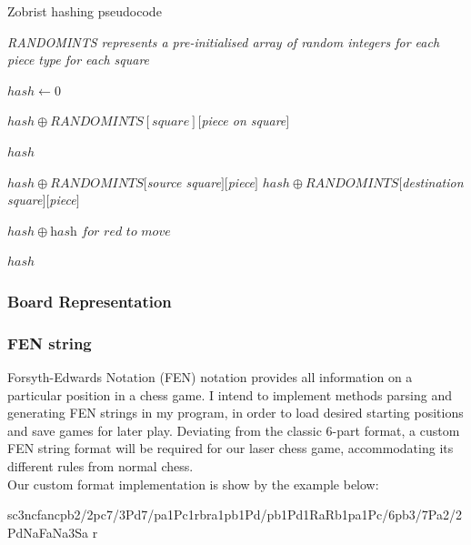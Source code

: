 \documentclass[../main/main.tex]{subfiles}
\begin{document}
\begin{algorithm}[H]
\caption{Zobrist hashing pseudocode}
\begin{algorithmic}
    \item \textit{RANDOMINTS represents a pre-initialised array of random integers for each piece type for each square}
    
    \bigskip

        \State $hash \gets 0$

                \State $hash \oplus RANDOMINTS[square][$\textit{piece on square}$]$
            \EndIf
        \EndFor
        
        \State \Return $hash$
    \EndFunction

    \bigskip

        \State $hash \oplus RANDOMINTS[$\textit{source square}$][$\textit{piece}$]$
        \State $hash \oplus RANDOMINTS[$\textit{destination square}$][$\textit{piece}$]$

            \State $hash \oplus \textit{hash for red to move}$ 
        \EndIf
        
        \State \Return $hash$
    \EndFunction
\end{algorithmic}
\end{algorithm}

\subsubsection{Board Representation}
\subsubsection*{FEN string}
Forsyth-Edwards Notation (FEN) notation provides all information on a particular position in a chess game. I intend to implement methods parsing and generating FEN strings in my program, in order to load desired starting positions and save games for later play. Deviating from the classic 6-part format, a custom FEN string format will be required for our laser chess game, accommodating its different rules from normal chess.
\\
Our custom format implementation is show by the example below:

\begin{center}
sc3ncfancpb2/2pc7/3Pd7/pa1Pc1rbra1pb1Pd/pb1Pd1RaRb1pa1Pc/6pb3/7Pa2/2PdNaFaNa3Sa r
\end{center}
\end{document}
